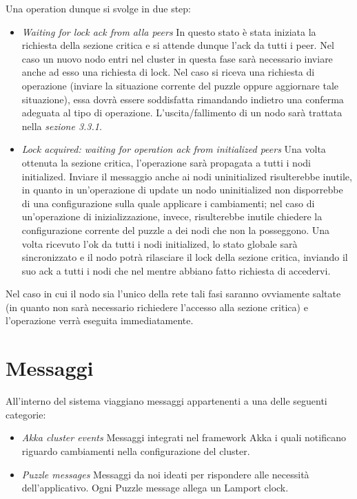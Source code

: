 \noindent Una operation dunque si svolge in due step:
\begin{itemize}
    \item \textit{Waiting for lock ack from alla peers} \newline
    In questo stato è stata iniziata la richiesta della sezione critica e si attende dunque l'ack da tutti i peer.\newline
    Nel caso un nuovo nodo entri nel cluster in questa fase sarà necessario inviare anche ad esso una richiesta di lock.\newline
    Nel caso si riceva una richiesta di operazione (inviare la situazione corrente del puzzle oppure aggiornare tale situazione), essa dovrà essere soddisfatta rimandando indietro una conferma adeguata al tipo di operazione.\newline
    L'uscita/fallimento di un nodo sarà trattata nella \textit{sezione 3.3.1}.
    \item \textit{Lock acquired: waiting for operation ack from initialized peers}\newline
    Una volta ottenuta la sezione critica, l'operazione sarà propagata a tutti i nodi initialized.\newline
    Inviare il messaggio anche ai nodi uninitialized risulterebbe inutile, in quanto in un'operazione di update un nodo uninitialized non disporrebbe di una configurazione sulla quale applicare i cambiamenti; nel caso di un'operazione di inizializzazione, invece, risulterebbe inutile chiedere la configurazione corrente del puzzle a dei nodi che non la posseggono.\newline
    Una volta ricevuto l'ok da tutti i nodi initialized, lo stato globale sarà sincronizzato e il nodo potrà rilasciare il lock della sezione critica, inviando il suo ack a tutti i nodi che nel mentre abbiano fatto richiesta di accedervi.
\end{itemize}
Nel caso in cui il nodo sia l'unico della rete tali fasi saranno ovviamente saltate (in quanto non sarà necessario richiedere l'accesso alla sezione critica) e l'operazione verrà eseguita immediatamente.

\section{Messaggi}
All'interno del sistema viaggiano messaggi appartenenti a una delle seguenti categorie:
\begin{itemize}
    \item \textit{Akka cluster events}\newline
    Messaggi integrati nel framework Akka i quali notificano riguardo cambiamenti nella configurazione del cluster.
    \item \textit{Puzzle messages}\newline
    Messaggi da noi ideati per rispondere alle necessità dell'applicativo. Ogni Puzzle message allega un Lamport clock.
\end{itemize}
